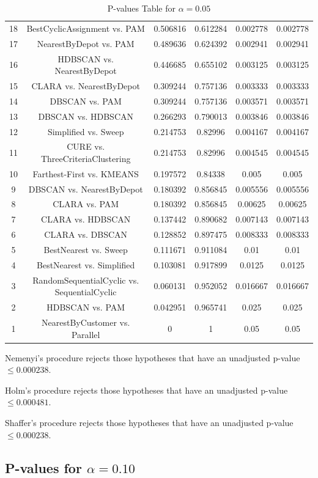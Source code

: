 \documentclass[a4paper,10pt]{article}
\begin{document}
\begin{landscape}
\begin{table}[!htp]
\begin{tabular}{cccccc}
18&BestCyclicAssignment vs. PAM&0.506816&0.612284&0.002778&0.002778\\
17&NearestByDepot vs. PAM&0.489636&0.624392&0.002941&0.002941\\
16&HDBSCAN vs. NearestByDepot&0.446685&0.655102&0.003125&0.003125\\
15&CLARA vs. NearestByDepot&0.309244&0.757136&0.003333&0.003333\\
14&DBSCAN vs. PAM&0.309244&0.757136&0.003571&0.003571\\
13&DBSCAN vs. HDBSCAN&0.266293&0.790013&0.003846&0.003846\\
12&Simplified vs. Sweep&0.214753&0.82996&0.004167&0.004167\\
11&CURE vs. ThreeCriteriaClustering&0.214753&0.82996&0.004545&0.004545\\
10&Farthest-First vs. KMEANS&0.197572&0.84338&0.005&0.005\\
9&DBSCAN vs. NearestByDepot&0.180392&0.856845&0.005556&0.005556\\
8&CLARA vs. PAM&0.180392&0.856845&0.00625&0.00625\\
7&CLARA vs. HDBSCAN&0.137442&0.890682&0.007143&0.007143\\
6&CLARA vs. DBSCAN&0.128852&0.897475&0.008333&0.008333\\
5&BestNearest vs. Sweep&0.111671&0.911084&0.01&0.01\\
4&BestNearest vs. Simplified&0.103081&0.917899&0.0125&0.0125\\
3&RandomSequentialCyclic vs. SequentialCyclic&0.060131&0.952052&0.016667&0.016667\\
2&HDBSCAN vs. PAM&0.042951&0.965741&0.025&0.025\\
1&NearestByCustomer vs. Parallel&0&1&0.05&0.05\\
\hline
\end{tabular}
\caption{P-values Table for $\alpha=0.05$}
\end{table}Nemenyi's procedure rejects those hypotheses that have an unadjusted p-value $\le0.000238$.

Holm's procedure rejects those hypotheses that have an unadjusted p-value $\le0.000481$.

Shaffer's procedure rejects those hypotheses that have an unadjusted p-value $\le0.000238$.

\pagebreak

\subsection{P-values for $\alpha=0.10$}


\end{landscape}
\end{document}
